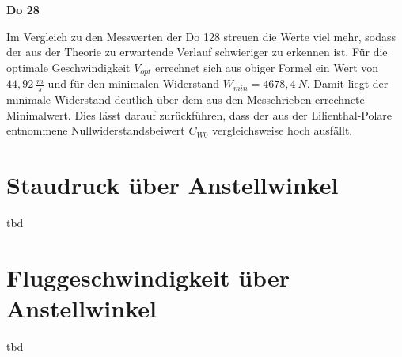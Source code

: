 \textbf{Do 28}

Im Vergleich zu den Messwerten der Do 128 streuen die Werte viel mehr, sodass der aus der Theorie zu erwartende Verlauf schwieriger zu erkennen ist. Für die optimale Geschwindigkeit $V_{opt}$ errechnet sich aus obiger Formel ein Wert von $44,92 \ \frac{m}{s}$ und für den minimalen Widerstand $W_{min}=4678,4 \ N$. Damit liegt der minimale Widerstand deutlich über dem aus den Messchrieben errechnete Minimalwert. Dies lässt darauf zurückführen, dass der aus der Lilienthal-Polare entnommene Nullwiderstandsbeiwert $C_{W0}$ vergleichsweise hoch ausfällt. 


\section{Staudruck über Anstellwinkel}
tbd

\section{Fluggeschwindigkeit über Anstellwinkel}
tbd
